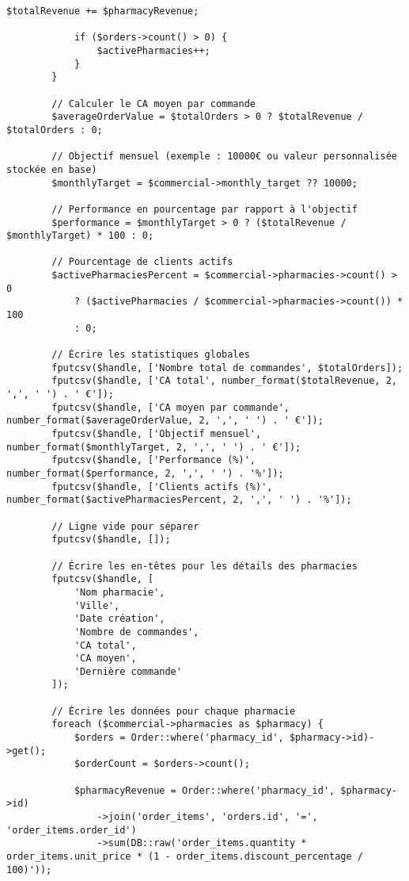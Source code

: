 \documentclass[12pt,a4paper]{article}
\begin{document}
\begin{lstlisting}[caption=Méthode exportCommercialPerformance]
            $totalRevenue += $pharmacyRevenue;
            
            if ($orders->count() > 0) {
                $activePharmacies++;
            }
        }
        
        // Calculer le CA moyen par commande
        $averageOrderValue = $totalOrders > 0 ? $totalRevenue / $totalOrders : 0;
        
        // Objectif mensuel (exemple : 10000€ ou valeur personnalisée stockée en base)
        $monthlyTarget = $commercial->monthly_target ?? 10000;
        
        // Performance en pourcentage par rapport à l'objectif
        $performance = $monthlyTarget > 0 ? ($totalRevenue / $monthlyTarget) * 100 : 0;
        
        // Pourcentage de clients actifs
        $activePharmaciesPercent = $commercial->pharmacies->count() > 0 
            ? ($activePharmacies / $commercial->pharmacies->count()) * 100 
            : 0;
        
        // Écrire les statistiques globales
        fputcsv($handle, ['Nombre total de commandes', $totalOrders]);
        fputcsv($handle, ['CA total', number_format($totalRevenue, 2, ',', ' ') . ' €']);
        fputcsv($handle, ['CA moyen par commande', number_format($averageOrderValue, 2, ',', ' ') . ' €']);
        fputcsv($handle, ['Objectif mensuel', number_format($monthlyTarget, 2, ',', ' ') . ' €']);
        fputcsv($handle, ['Performance (%)', number_format($performance, 2, ',', ' ') . '%']);
        fputcsv($handle, ['Clients actifs (%)', number_format($activePharmaciesPercent, 2, ',', ' ') . '%']);
        
        // Ligne vide pour séparer
        fputcsv($handle, []);
        
        // Écrire les en-têtes pour les détails des pharmacies
        fputcsv($handle, [
            'Nom pharmacie',
            'Ville',
            'Date création',
            'Nombre de commandes',
            'CA total',
            'CA moyen',
            'Dernière commande'
        ]);
        
        // Écrire les données pour chaque pharmacie
        foreach ($commercial->pharmacies as $pharmacy) {
            $orders = Order::where('pharmacy_id', $pharmacy->id)->get();
            $orderCount = $orders->count();
            
            $pharmacyRevenue = Order::where('pharmacy_id', $pharmacy->id)
                ->join('order_items', 'orders.id', '=', 'order_items.order_id')
                ->sum(DB::raw('order_items.quantity * order_items.unit_price * (1 - order_items.discount_percentage / 100)'));
            

\end{lstlisting}
\end{document}
